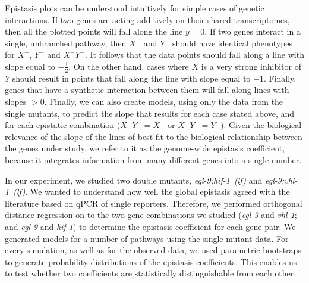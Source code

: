 \documentclass[9pt,twocolumn,twoside]{pnas-new}
\newcommand{\gene}[1]{\emph{#1}}
\newcommand{\eglvhl}{\emph{egl-9;vhl-1~(lf)}}
\newcommand{\eglhif}{\emph{egl-9;hif-1~(lf)}}
\begin{document}
Epistasis plots can be understood intuitively for simple cases of genetic
interactions. If two genes are acting additively on their shared transcriptomes,
then all the plotted points will fall along the line $y=0$.
If two genes interact in a single, unbranched pathway, then $X^-$ and $Y^-$ should
have identical phenotypes for $X^-$, $Y^-$ and $X^-Y^-$. It follows that the
data points should fall along a line with slope equal to $-\frac{1}{2}$. On the
other hand, cases where $X$ is a very strong inhibitor of $Y$ should result in points
that fall along the line with slope equal to $-1$. Finally, genes that have a
synthetic interaction between them will fall along lines with slopes $>0$. Finally,
we can also create models, using only the data from the single mutants, to
predict the slope that results for each case stated above, and for  each epistatic
combination ($X^-Y^-=X^-$ or $X^-Y^-=Y^-$). Given the biological relevance of the
slope of the lines of best fit to the biological relationship between the genes
under study, we refer to it as the genome-wide epistasis coefficient, because it
integrates information from many different genes into a single number.

In our experiment, we studied two double mutants, \eglhif{} and \eglvhl{}.
We wanted to understand how well the global epistasis agreed with the literature
based on qPCR of single reporters. Therefore, we performed orthogonal distance
regression on to the two gene combinations we studied (\gene{egl-9} and \gene{vhl-1};
and \gene{egl-9} and \gene{hif-1}) to determine the epistasis coefficient for each
gene pair. We generated models for a number of pathways using the single mutant
data. For every simulation, as well as for the observed data, we used parametric
bootstraps to generate probability distributions of the epistasis coefficients.
This enables us to test whether two coefficients are statistically distinguishable
from each other.
\end{document}
